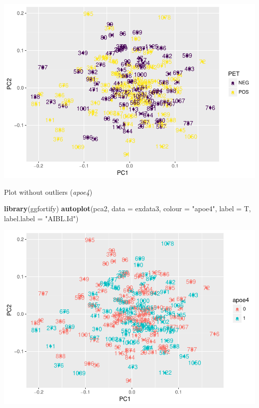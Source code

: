 \documentclass[]{article}
\newenvironment{Shaded}{\begin{snugshade}}{\end{snugshade}}
\newcommand{\KeywordTok}[1]{\textcolor[rgb]{0.13,0.29,0.53}{\textbf{#1}}}
\newcommand{\DataTypeTok}[1]{\textcolor[rgb]{0.13,0.29,0.53}{#1}}
\newcommand{\StringTok}[1]{\textcolor[rgb]{0.31,0.60,0.02}{#1}}
\newcommand{\NormalTok}[1]{#1}
\begin{document}
\includegraphics{20180125_summary_to_date_files/figure-latex/unnamed-chunk-73-1.pdf}

Plot without outliers (\emph{apoe4})

\begin{Shaded}
\begin{Highlighting}[]
\KeywordTok{library}\NormalTok{(ggfortify)}
\KeywordTok{autoplot}\NormalTok{(pca2, }\DataTypeTok{data =}\NormalTok{ exdata3, }\DataTypeTok{colour =} \StringTok{"apoe4"}\NormalTok{, }\DataTypeTok{label =}\NormalTok{ T, }\DataTypeTok{label.label =} \StringTok{"AIBL.Id"}\NormalTok{)}
\end{Highlighting}
\end{Shaded}

\includegraphics{20180125_summary_to_date_files/figure-latex/unnamed-chunk-74-1.pdf}
\end{document}
